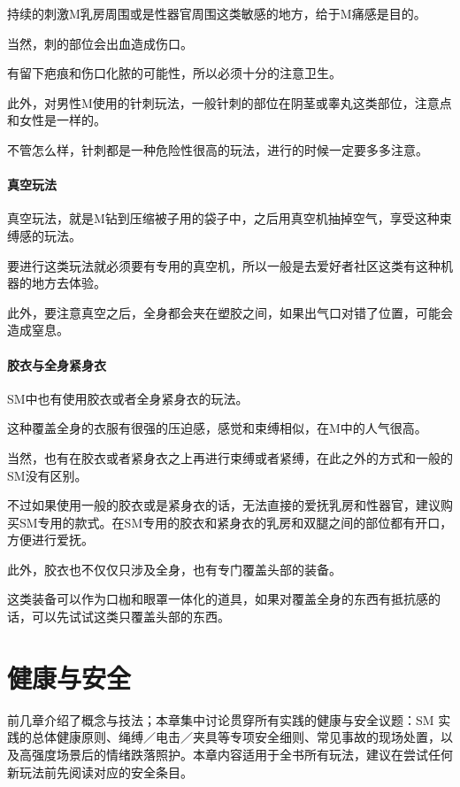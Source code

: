 \documentclass[12pt,UTF8]{ctexbook}
\begin{document}
持续的刺激M乳房周围或是性器官周围这类敏感的地方，给于M痛感是目的。

当然，刺的部位会出血造成伤口。

有留下疤痕和伤口化脓的可能性，所以必须十分的注意卫生。

此外，对男性M使用的针刺玩法，一般针刺的部位在阴茎或睾丸这类部位，注意点和女性是一样的。

不管怎么样，针刺都是一种危险性很高的玩法，进行的时候一定要多多注意。 

\subsubsection{真空玩法}

真空玩法，就是M钻到压缩被子用的袋子中，之后用真空机抽掉空气，享受这种束缚感的玩法。

要进行这类玩法就必须要有专用的真空机，所以一般是去爱好者社区这类有这种机器的地方去体验。

此外，要注意真空之后，全身都会夹在塑胶之间，如果出气口对错了位置，可能会造成窒息。 

\subsubsection{胶衣与全身紧身衣}

SM中也有使用胶衣或者全身紧身衣的玩法。

这种覆盖全身的衣服有很强的压迫感，感觉和束缚相似，在M中的人气很高。

当然，也有在胶衣或者紧身衣之上再进行束缚或者紧缚，在此之外的方式和一般的SM没有区别。

不过如果使用一般的胶衣或是紧身衣的话，无法直接的爱抚乳房和性器官，建议购买SM专用的款式。在SM专用的胶衣和紧身衣的乳房和双腿之间的部位都有开口，方便进行爱抚。

此外，胶衣也不仅仅只涉及全身，也有专门覆盖头部的装备。

这类装备可以作为口枷和眼罩一体化的道具，如果对覆盖全身的东西有抵抗感的话，可以先试试这类只覆盖头部的东西。

\chapter{健康与安全}\label{chap:safety}

前几章介绍了概念与技法；本章集中讨论贯穿所有实践的健康与安全议题：SM 实践的总体健康原则、绳缚／电击／夹具等专项安全细则、常见事故的现场处置，以及高强度场景后的情绪跌落照护。本章内容适用于全书所有玩法，建议在尝试任何新玩法前先阅读对应的安全条目。
\end{document}
